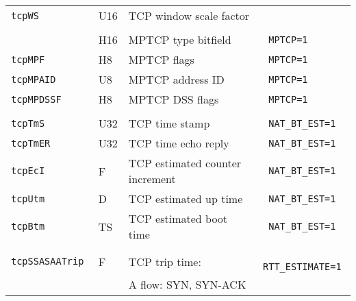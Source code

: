 \documentclass[documentation]{subfiles}
\begin{document}
\begin{longtable}{>{\tt}lll>{\tt\small}l}
    tcpWS                            & U16        & TCP window scale factor                               & \\
    \\
    \nameref{tcpMPTBF}               & H16        & MPTCP type bitfield                                   & MPTCP=1\\
    tcpMPF                           & H8         & MPTCP flags                                           & MPTCP=1\\
    tcpMPAID                         & U8         & MPTCP address ID                                      & MPTCP=1\\
    tcpMPDSSF                        & H8         & MPTCP DSS flags                                       & MPTCP=1\\
    \\
    tcpTmS                           & U32        & TCP time stamp                                        & NAT\_BT\_EST=1\\
    tcpTmER                          & U32        & TCP time echo reply                                   & NAT\_BT\_EST=1\\
    tcpEcI                           & F          & TCP estimated counter increment                       & NAT\_BT\_EST=1\\
    tcpUtm                           & D          & TCP estimated up time                                 & NAT\_BT\_EST=1\\
    tcpBtm                           & TS         & TCP estimated boot time                               & NAT\_BT\_EST=1\\
    \\
    tcpSSASAATrip                    & F          & TCP trip time:                                        & RTT\_ESTIMATE=1\\
                                     &            & \qquad A flow: SYN, SYN-ACK                           & \\

\end{longtable}
\end{document}
